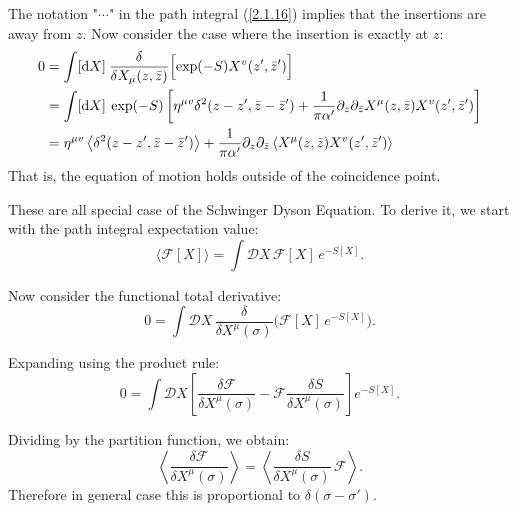 The notation "$\cdots$" in the path integral (\ref{2.1.16}) implies that the insertions are away from $z$.    
Now consider the case where the insertion is exactly at $z$:    
\begin{align}
	0 &=\int[\mathrm{d} X] \: \frac{\delta}{\delta X_{\mu}(z, \bar{z})}\Bigl[\exp (-S) X^{v}(z^{\prime}, \bar{z}^{\prime})\Bigr] \nonumber \\
	&=\int[\mathrm{d} X]\: \exp (-S)\left[\eta^{\mu v} \delta^{2}(z-z^{\prime}, \bar{z}-\bar{z}^{\prime})+\frac{1}{\pi \alpha^{\prime}} \partial_{z} \partial_{\bar{z}} X^{\mu}(z, \bar{z}) X^{v}(z^{\prime}, \bar{z}^{\prime})\right] \nonumber \\
	&=\eta^{\mu v}\left\langle\delta^{2}(z-z^{\prime}, \bar{z}-\bar{z}^{\prime})\right\rangle+\frac{1}{\pi \alpha^{\prime}} \partial_{z} \partial_{\bar{z}}\left\langle X^{\mu}(z, \bar{z}) X^{v}(z^{\prime}, \bar{z}^{\prime})\right\rangle \label{2.1.18}
\end{align}
That is, the equation of motion holds outside of the coincidence point.
\begin{tcolorbox}[breakable]
	\begin{remark}These are all special case of the Schwinger Dyson Equation. To derive it, we start with the path integral expectation value:
			\begin{equation}
				\langle \mathscr{F}[X] \rangle 
				= \int \mathcal{D}X \, \mathscr{F}[X] \, e^{-S[X]}.
			\end{equation}
			
			Now consider the functional total derivative:
			\begin{equation}
				0 = \int \mathcal{D}X \, 
				\frac{\delta}{\delta X^\mu(\sigma)} 
				\Big( \mathscr{F}[X] \, e^{-S[X]} \Big).
			\end{equation}
			
			Expanding using the product rule:
			\begin{equation}
				0 = \int \mathcal{D}X \left[
				\frac{\delta \mathscr{F}}{\delta X^\mu(\sigma)} 
				- \mathscr{F} \frac{\delta S}{\delta X^\mu(\sigma)}
				\right] e^{-S[X]}.
			\end{equation}
			
			Dividing by the partition function, we obtain:
			\begin{equation}
				\left\langle \frac{\delta \mathscr{F}}{\delta X^\mu(\sigma)} \right\rangle
				=
				\left\langle \frac{\delta S}{\delta X^\mu(\sigma)} \, \mathscr{F} \right\rangle.\label{impiden}
			\end{equation}
			Therefore in general case this is proportional to $\delta(\sigma-\sigma')$.
	\end{remark}
\end{tcolorbox}
